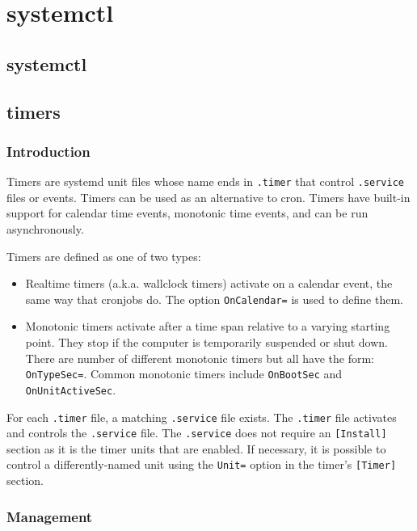 \chapter{systemctl}



\section{systemctl}

\section{timers}
\subsection{Introduction}
Timers are systemd unit files whose name ends in \verb+.timer+ that control
\verb+.service+ files or events. Timers can be used as an alternative to cron.
Timers have built-in support for calendar time events, monotonic time events,
and can be run asynchronously. 

Timers are defined as one of two types:
\begin{itemize}
    \item Realtime timers (a.k.a. wallclock timers) activate on a calendar
        event, the same way that cronjobs do. The option \verb+OnCalendar=+ is used to define them.
    \item Monotonic timers activate after a time span relative to a varying
        starting point. They stop if the computer is temporarily suspended or
        shut down. There are number of different monotonic timers but all have
        the form: \verb+OnTypeSec=+. Common monotonic timers include
        \verb+OnBootSec+ and \verb+OnUnitActiveSec+.
\end{itemize}

For each \verb+.timer+ file, a matching \verb+.service+ file exists. The
\verb+.timer+ file activates and controls the \verb+.service+ file. The
\verb+.service+ does not require an \verb+[Install]+ section as it is the timer
units that are enabled. If necessary, it is possible to control a
differently-named unit using the \verb+Unit=+ option in the timer's
\verb+[Timer]+ section. 

\subsection{Management}

